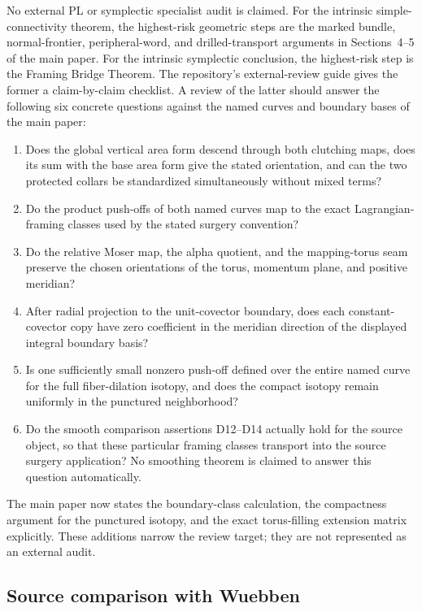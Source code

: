 \documentclass[11pt]{article}
\theoremstyle{definition}
\begin{document}
No external PL or symplectic specialist audit is claimed.  For the intrinsic
simple-connectivity theorem, the highest-risk geometric steps are the marked
bundle, normal-frontier, peripheral-word, and drilled-transport arguments in
Sections~4--5 of the main paper.  For the intrinsic symplectic conclusion,
the highest-risk step is the Framing Bridge Theorem.  The repository's
external-review guide gives the former a claim-by-claim checklist.  A review
of the latter should answer the following six concrete questions against the
named curves and boundary bases of the main paper:
\begin{enumerate}[label=(\roman*)]
\item Does the global vertical area form descend through both clutching maps,
  does its sum with the base area form give the stated orientation, and can
  the two protected collars be standardized simultaneously without mixed
  terms?
\item Do the product push-offs of both named curves map to the exact
  Lagrangian-framing classes used by the stated surgery convention?
\item Do the relative Moser map, the alpha quotient, and the mapping-torus
  seam preserve the chosen orientations of the torus, momentum plane, and
  positive meridian?
\item After radial projection to the unit-covector boundary, does each
  constant-covector copy have zero coefficient in the meridian direction of
  the displayed integral boundary basis?
\item Is one sufficiently small nonzero push-off defined over the entire
  named curve for the full fiber-dilation isotopy, and does the compact
  isotopy remain uniformly in the punctured neighborhood?
\item Do the smooth comparison assertions D12--D14 actually hold for the
source object, so that these particular framing classes transport into the
source surgery application?  No smoothing theorem is claimed to answer this
question automatically.
\end{enumerate}
The main paper now states the boundary-class calculation, the compactness
argument for the punctured isotopy, and the exact torus-filling extension
matrix explicitly.  These additions narrow the review target; they are not
represented as an external audit.

\subsection*{Source comparison with Wuebben}
\end{document}
